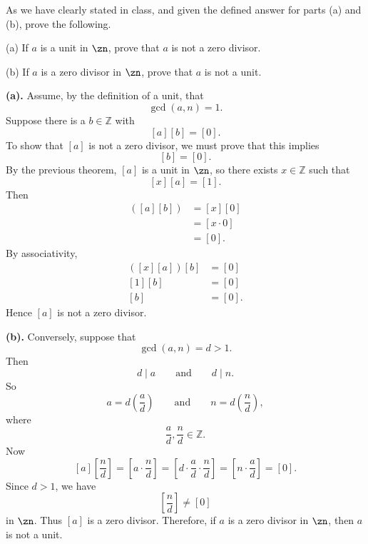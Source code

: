 \begin{problem}{
    As we have clearly stated in class, and given the defined answer for parts (a) and (b), prove the following.

    (a) If $a$ is a unit in $\zn$, prove that $a$ is not a zero divisor.

    (b) If $a$ is a zero divisor in $\zn$, prove that $a$ is not a unit.
}
    \textbf{(a).}
    Assume, by the definition of a unit, that
    \[
        \gcd(a,n)=1.
    \]
    Suppose there is a $b\in\mathbb{Z}$ with
    \[
        [a][b]=[0].
    \]
    To show that $[a]$ is not a zero divisor, we must prove that this implies
    \[
        [b]=[0].
    \]
    By the previous theorem, $[a]$ is a unit in $\zn$, so there exists $x\in\mathbb{Z}$ such that
    \[
        [x][a]=[1].
    \]
    Then
    \begin{align*}
        [x]([a][b]) &= [x][0]\\
        &= [x\cdot 0]\\
        &= [0].
    \end{align*}
    By associativity,
    \begin{align*}
        ([x][a])[b] &= [0]\\
    [1][b] &= [0]\\
    [b] &= [0].
    \end{align*}
    Hence $[a]$ is not a zero divisor.

    \textbf{(b).}
    Conversely, suppose that
    \[
        \gcd(a,n)=d>1.
    \]
    Then
    \[
        d\mid a
        \qquad\text{and}\qquad
        d\mid n.
    \]
    So
    \[
        a=d\left(\frac{a}{d}\right)
        \qquad\text{and}\qquad
        n=d\left(\frac{n}{d}\right),
    \]
    where
    \[
        \frac{a}{d},\frac{n}{d}\in\mathbb{Z}.
    \]
    Now
    \[
        [a]\left[\frac{n}{d}\right]
        =
        \left[a\cdot \frac{n}{d}\right]
        =
        \left[d\cdot \frac{a}{d}\cdot \frac{n}{d}\right]
        =
        \left[n\cdot \frac{a}{d}\right]
        =
        [0].
    \]
    Since $d>1$, we have
    \[
        \left[\frac{n}{d}\right]\neq [0]
    \]
    in $\zn$.
    Thus $[a]$ is a zero divisor.
    Therefore, if $a$ is a zero divisor in $\zn$, then $a$ is not a unit.
\end{problem}

